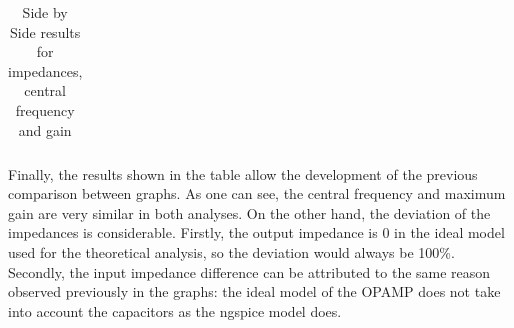 \begin{table}[h]
    {
      \centering
      \begin{tabular}{|c|c|c|c|}
        \hline
        
      \end{tabular}
      \caption{Side by Side results for impedances, central frequency and gain}
      \label{tab:TheoreticalResults}
    }
\end{table}

Finally, the results shown in the table allow the development of the previous comparison between graphs. As one can see, the central frequency and maximum gain are very similar in both analyses.
On the other hand, the deviation of the impedances is considerable. Firstly, the output impedance is 0 in the ideal model used for the theoretical analysis, so the deviation would always be 100\%.
Secondly, the input impedance difference can be attributed to the same reason observed previously in the graphs: the ideal model of the OPAMP does not take into account the capacitors as
the ngspice model does. 
